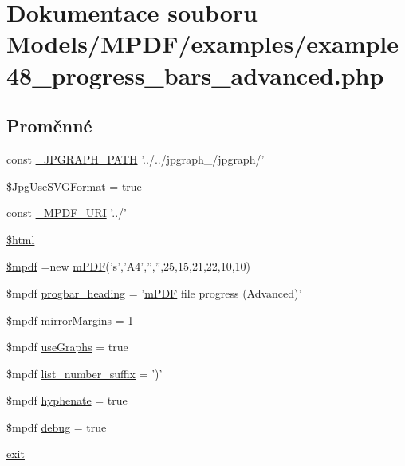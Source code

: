 \hypertarget{example48__progress__bars__advanced_8php}{\section{Dokumentace souboru Models/\-M\-P\-D\-F/examples/example48\-\_\-progress\-\_\-bars\-\_\-advanced.php}
\label{example48__progress__bars__advanced_8php}
}
\subsection*{Proměnné}
\begin{DoxyCompactItemize}
\item 
const \hyperlink{example48__progress__bars__advanced_8php_aa256b12517ab22b9550c150865a689c4}{\-\_\-\-J\-P\-G\-R\-A\-P\-H\-\_\-\-P\-A\-T\-H} '../../jpgraph\-\_/jpgraph/'
\item 
\hyperlink{example48__progress__bars__advanced_8php_a4767d5ef05aa1f95f7a64c0aa8f26ccc}{\$\-Jpg\-Use\-S\-V\-G\-Format} = true
\item 
const \hyperlink{example48__progress__bars__advanced_8php_a1ff50e3d84f8270d034f2e9d99c147c0}{\-\_\-\-M\-P\-D\-F\-\_\-\-U\-R\-I} '../'
\item 
\hyperlink{example48__progress__bars__advanced_8php_a6f96e7fc92441776c9d1cd3386663b40}{\$html}
\item 
\hyperlink{example48__progress__bars__advanced_8php_ad028f81910d6cbab9b184d2214b3a8f8}{\$mpdf} =new \hyperlink{classm_p_d_f}{m\-P\-D\-F}('s','A4','','',25,15,21,22,10,10)
\item 
\$mpdf \hyperlink{example48__progress__bars__advanced_8php_a56749e325603f4a2e926e2a4b15554af}{progbar\-\_\-heading} = '\hyperlink{classm_p_d_f}{m\-P\-D\-F} file progress (Advanced)'
\item 
\$mpdf \hyperlink{example48__progress__bars__advanced_8php_a24c284cb7774410f65953584ea1fd9c1}{mirror\-Margins} = 1
\item 
\$mpdf \hyperlink{example48__progress__bars__advanced_8php_a789abe3531b709632605a9c52e9ba0d9}{use\-Graphs} = true
\item 
\$mpdf \hyperlink{example48__progress__bars__advanced_8php_a0e143fd6cd1ed977446f3abf05380031}{list\-\_\-number\-\_\-suffix} = ')'
\item 
\$mpdf \hyperlink{example48__progress__bars__advanced_8php_a988e0360138a1001f27d70c65256d100}{hyphenate} = true
\item 
\$mpdf \hyperlink{example48__progress__bars__advanced_8php_a200a436f1833a712239f1ae5bec608db}{debug} = true
\item 
\hyperlink{example48__progress__bars__advanced_8php_a6733eb5f605d09eaede9845835d71c4e}{exit}
\end{DoxyCompactItemize}



